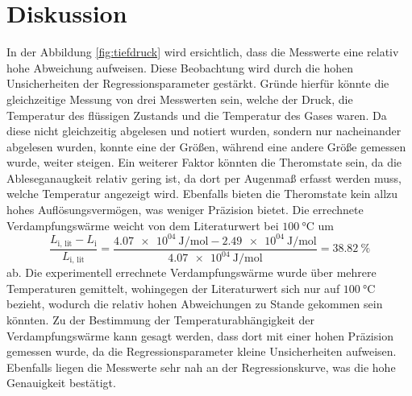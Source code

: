 \section{Diskussion}
\label{sec:Diskussion}
In der Abbildung \ref{fig:tiefdruck} wird ersichtlich, dass die Messwerte eine relativ hohe Abweichung aufweisen.
Diese Beobachtung wird durch die hohen Unsicherheiten der Regressionsparameter gestärkt.
Gründe hierfür könnte die gleichzeitige Messung von drei Messwerten sein, welche der Druck, die Temperatur des flüssigen Zustands und die Temperatur des Gases 
waren.
Da diese nicht gleichzeitig abgelesen und notiert wurden, sondern nur nacheinander abgelesen wurden, konnte eine der Größen, während eine andere Größe gemessen wurde,
weiter steigen.
Ein weiterer Faktor könnten die Theromstate sein, da die Ableseganaugkeit relativ gering ist, da dort per Augenmaß erfasst werden muss, welche Temperatur angezeigt wird.
Ebenfalls bieten die Theromstate kein allzu hohes Auflösungsvermögen, was weniger Präzision bietet.
Die errechnete Verdampfungswärme weicht von dem Literaturwert\cite{lit} bei $\SI{100}{\celsius}$ um
\begin{equation*}
    \frac{L_\text{i, lit} - L_\text{i}}{L_\text{i, lit}} = \frac{\SI{4.07e04}{\joule\per\mole} - \SI{2.49e04}{\joule\per\mole}}{\SI{4.07e04}{\joule\per\mole}} = \SI{38.82}{\percent}
\end{equation*}
ab.
Die experimentell errechnete Verdampfungswärme wurde über mehrere Temperaturen gemittelt, wohingegen der Literaturwert sich nur auf $\SI{100}{\celsius}$ bezieht,
wodurch die relativ hohen Abweichungen zu Stande gekommen sein könnten.
Zu der Bestimmung der Temperaturabhängigkeit der Verdampfungswärme kann gesagt werden, dass dort mit einer hohen Präzision gemessen wurde, da die Regressionsparameter
kleine Unsicherheiten aufweisen.
Ebenfalls liegen die Messwerte sehr nah an der Regressionskurve, was die hohe Genauigkeit bestätigt.